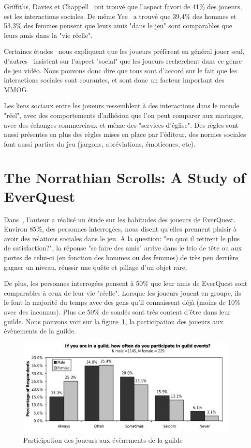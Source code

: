 \documentclass[10pt,twocolumn]{article}
\begin{document}
Griffiths, Davies et Chappell~\cite{BreakingSteretype} ont trouvé que l'aspect favori de 41\% des joueurs, est les interactions sociales. De même Yee~\cite{1159988} a trouvé que 39,4\% des hommes et 53,3\% des femmes pensent que leurs amis "dans le jeu" sont comparables que leurs amis dans la "vie réelle".
\par Certaines études~\cite{1124834,1031667} nous expliquent que les joueurs préfèrent en général jouer seul, d'autres~\cite{1159988,Jakobsson03thesopranos} insistent sur l'aspect "social" que les joueurs recherchent dans ce genre de jeu vidéo. Nous pouvons donc dire que tous sont d'accord sur le fait que les interactions sociales sont courantes, et sont donc un facteur important des MMOG.
\par Les liens sociaux entre les joueurs ressemblent à des interactions dans le monde "réel", avec des comportements d'adhésion que l'on peut comparer aux mariages, avec des échanges commerciaux et même des "services d'église". Des règles sont aussi présentes en plus des règles mises en place par l'éditeur, des normes sociales font aussi parties du jeu (jargons, abréviations, émoticones, etc).

\section{The Norrathian Scrolls: A Study of EverQuest}
Dans~\cite{StudyEQ}, l'auteur a réalisé un étude sur les habitudes des joueurs de EverQuest. Environ 85\%, des personnes interrogées, nous disent qu'elles prennent plaisir à avoir des relations sociales dans le jeu. A la question: "en quoi il retirent le plus de satisfaction?", la réponse "se faire des amis" arrive dans le trio de tête ou aux portes de celui-ci (en fonction des hommes ou des femmes) de très peu derrière gagner un niveau, réussir une quête et pillage d'un objet rare.
\par De plus, les personnes interrogées pensent à 50\% que leur amis de EverQuest sont comparables à ceux de leur vie "réelle". Lorsque les joueurs jouent en groupe, ils le font la majorité du temps avec des gens qu'il connaissent déjà (moins de 10\% avec des inconnus). Plus de 50\% de sondés sont très content d'être dans leur guilde. Nous pouvons voir sur la figure~\ref{guildpres}, la participation des joueurs aux évènements de la guilde.
        \begin{figure}[!h]
        \centering
        \includegraphics[scale=0.45]{./images/studypres.png}
        \caption{Participation des joueurs aux évènements de la guilde}
        \label{guildpres}
        \end{figure}
\end{document}
